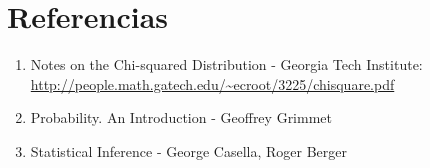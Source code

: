 \documentclass[a4paper, 10pt]{article} %
\begin{document}

\section{Referencias}
\begin{enumerate}
  \item Notes on the Chi-squared Distribution - Georgia Tech Institute: \url{http://people.math.gatech.edu/~ecroot/3225/chisquare.pdf}
  \item Probability. An Introduction - Geoffrey Grimmet
  \item Statistical Inference - George Casella, Roger Berger
\end{enumerate}
\end{document}
